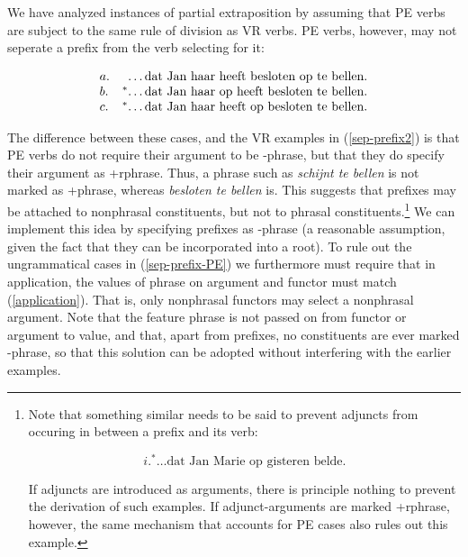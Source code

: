 We have analyzed instances of partial extraposition by assuming that PE verbs
are subject to the same rule of division as VR verbs.  PE verbs, however, may
not seperate a prefix from the verb selecting for it:

\begin{equation}
\label{sep-prefix-PE}
\begin{array}[t]{ll@{\hspace{0cm}}l}
a. && \ldots\mbox{dat Jan haar  heeft besloten op te bellen}. \\
b. &^*& \ldots\mbox{dat Jan haar op heeft besloten te bellen}. \\
c. &^*& \ldots\mbox{dat Jan haar heeft op besloten te bellen}. 
\end{array}
\end{equation}

\noindent The difference between these cases, and the VR examples in
(\ref{sep-prefix2}) is that PE verbs do not require their argument to be {\sc
-phrase}, but that they do specify their argument as {\sc +rphrase}.  Thus, a
phrase such as {\em schijnt te bellen} is not marked as {\sc +phrase}, whereas
{\em besloten te bellen} is.  This suggests that prefixes may be attached to
nonphrasal constituents, but not to phrasal constituents.\footnote{ Note that
something similar needs to be said to prevent adjuncts from occuring in between
a prefix and its verb:

\[ i. ^*\ldots\mbox{dat Jan Marie op gisteren belde.} \]

\noindent If adjuncts are introduced as arguments, there is principle nothing to
prevent the derivation of such examples.  If adjunct-arguments are marked {\sc
+rphrase}, however, the same mechanism that accounts for PE cases also rules out
this example.}  
We can implement this idea by specifying prefixes as {\sc
-phrase} (a reasonable assumption, given the fact that they can be incorporated
into a root).  To rule out the ungrammatical cases in (\ref{sep-prefix-PE}) we
furthermore must require that in application, the values of {\sc phrase} on
argument and functor must match (\ref{application}).  That is, only nonphrasal 
functors may select a
nonphrasal argument.  Note that the feature {\sc phrase} is not passed on from
functor or argument to value, and that, apart from prefixes, no constituents are
ever marked {\sc -phrase}, so that this solution can be adopted without
interfering with the earlier examples.

\pr
\label{application}
\pred
{}
\epred
\epr
 
